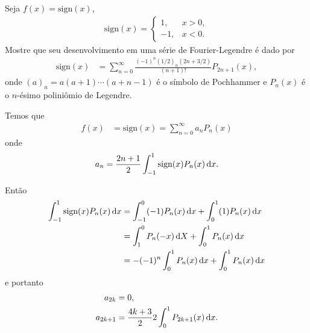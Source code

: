 \documentclass[a4paper,12pt, leqno, answers]{exam}
\begin{document}
\begin{questions}
    \question[P1 de 2006] Seja $f(x) = \text{sign}(x)$,
    \begin{align*}
        \text{sign}(x) = \begin{cases}
            1, & x > 0, \\
            -1, & x < 0.
        \end{cases}
    \end{align*}
    Mostre que seu desenvolvimento em uma s\'{e}rie de Fourier-Legendre \'{e} dado por
    \begin{align*}
        \text{sign}(x) &= \sum_{n = 0}^\infty \frac{(-1)^n (1/2)_n (2n + 3/2)}{(n + 1)!} P_{2n + 1}(x),
    \end{align*}
    onde $(a)_n = a (a + 1) \cdots (a + n - 1)$ \'{e} o s\'{i}mbolo de Pochhammer e $P_n(x)$ \'{e} o $n$-\'{e}simo polini\^{o}mio de Legendre.
    \begin{solution}
        Temos que
        \begin{align*}
            f(x) &= \text{sign}(x) = \sum_{n = 0}^\infty a_n P_n(x)
        \end{align*}
        onde
        \begin{align*}
            a_n = \frac{2n + 1}{2} \int_{-1}^1 \text{sign}(x) P_n(x) \, \mathrm{d}x.
        \end{align*}

        Ent\~{a}o
        \begin{align*}
            \int_{-1}^1 \text{sign}(x) P_n(x) \, \mathrm{d}x &= \int_{-1}^0 (-1) P_n(x) \, \mathrm{d}x + \int_0^1 (1) P_n(x) \, \mathrm{d}x \\
            &= \int_1^0 P_n(-x) \, \mathrm{d}X + \int_0^1 P_n(x) \, \mathrm{d}x \\
            &= -(-1)^n \int_0^1 P_n(x) \, \mathrm{d}x + \int_0^1 P_n(x) \, \mathrm{d}x
        \end{align*}
        e portanto
        \begin{align*}
            a_{2k} &= 0, \\
            a_{2k+1} &= \frac{4k + 3}{2} 2 \int_0^1 P_{2k+1}(x) \, \mathrm{d}x.
        \end{align*}


\end{solution}
\end{questions}
\end{document}
